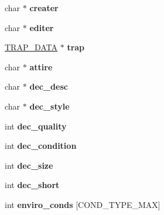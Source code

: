 \begin{DoxyCompactItemize}
\item 
\hypertarget{structobj__data_a166a91cde88d7e5d3949646b43475c58}{char $\ast$ {\bfseries creater}}\label{structobj__data_a166a91cde88d7e5d3949646b43475c58}

\item 
\hypertarget{structobj__data_a72f19d1644d95b9629572f77eb201cdf}{char $\ast$ {\bfseries editer}}\label{structobj__data_a72f19d1644d95b9629572f77eb201cdf}

\item 
\hypertarget{structobj__data_a9f899aed113c04d4e1e0018c9beb19b9}{\hyperlink{structtrap__data}{T\-R\-A\-P\-\_\-\-D\-A\-T\-A} $\ast$ {\bfseries trap}}\label{structobj__data_a9f899aed113c04d4e1e0018c9beb19b9}

\item 
\hypertarget{structobj__data_afeec748d15675c4fd3c4e03ed7061b5f}{char $\ast$ {\bfseries attire}}\label{structobj__data_afeec748d15675c4fd3c4e03ed7061b5f}

\item 
\hypertarget{structobj__data_a7ca38e59d41145bb6908245876548fd4}{char $\ast$ {\bfseries dec\-\_\-desc}}\label{structobj__data_a7ca38e59d41145bb6908245876548fd4}

\item 
\hypertarget{structobj__data_a8e63675bf969348266df8ba8a451608c}{char $\ast$ {\bfseries dec\-\_\-style}}\label{structobj__data_a8e63675bf969348266df8ba8a451608c}

\item 
\hypertarget{structobj__data_aa6f2154accfbaabdcd450a11a9233079}{int {\bfseries dec\-\_\-quality}}\label{structobj__data_aa6f2154accfbaabdcd450a11a9233079}

\item 
\hypertarget{structobj__data_ac7693758728cd7e8f7d4ffdc51a916de}{int {\bfseries dec\-\_\-condition}}\label{structobj__data_ac7693758728cd7e8f7d4ffdc51a916de}

\item 
\hypertarget{structobj__data_a6a9ffe5837f57880397fa3dfec56a2ff}{int {\bfseries dec\-\_\-size}}\label{structobj__data_a6a9ffe5837f57880397fa3dfec56a2ff}

\item 
\hypertarget{structobj__data_abc3cf61947fa992f629c5f53b82d2713}{int {\bfseries dec\-\_\-short}}\label{structobj__data_abc3cf61947fa992f629c5f53b82d2713}

\item 
\hypertarget{structobj__data_a96a86c009fc0ab1166a4cd812074ab93}{int {\bfseries enviro\-\_\-conds} \mbox{[}C\-O\-N\-D\-\_\-\-T\-Y\-P\-E\-\_\-\-M\-A\-X\mbox{]}}\label{structobj__data_a96a86c009fc0ab1166a4cd812074ab93}


\end{DoxyCompactItemize}
